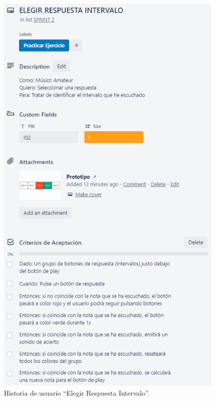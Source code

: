 \documentclass[12pt,twoside,titlepage]{report}
\begin{document}
{\begin{figure}[H]
    \centering
    \includegraphics[scale=1.3]{Scrum/User Stories/IntervalosRespuestas}
    \caption{Historia de usuario ``Elegir Respuesta Intervalo''.}
    \label{fig:IntervalosRespuestas}
\end{figure}

}
\end{document}
